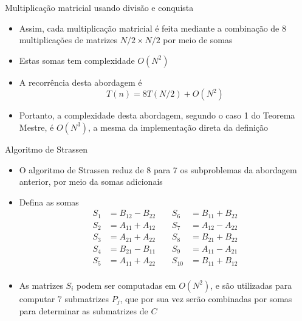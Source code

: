 \begin{frame}[fragile]{Multiplicação matricial usando divisão e conquista}

    \begin{itemize}
        \item Assim, cada multiplicação matricial é feita mediante a combinação de 8 multiplicações
            de matrizes $N/2 \times N/2$ por meio de somas

        \item Estas somas tem complexidade $O(N^2)$

        \item A recorrência desta abordagem é
        \[
            T(n) = 8T(N/2) + O(N^2)
        \]

        \item Portanto, a complexidade desta abordagem, segundo o caso 1 do Teorema Mestre, é
            $O(N^3)$, a mesma da implementação direta da definição

    \end{itemize}

\end{frame}

\begin{frame}[fragile]{Algoritmo de Strassen}

    \begin{itemize}
        \item O algoritmo de Strassen reduz de 8 para 7 os subproblemas da abordagem anterior,
            por meio da somas adicionais

        \item Defina as somas 
        \begin{align*}
            S_1 &= B_{12} - B_{22} & \ \ \ \ \ S_6 &=  B_{11} + B_{22} \\
            S_2 &= A_{11} + A_{12} & \ \ \ \ \ S_7 &=  A_{12} - A_{22} \\
            S_3 &= A_{21} + A_{22} & \ \ \ \ \ S_8 &=  B_{21} + B_{22} \\
            S_4 &= B_{21} - B_{11} & \ \ \ \ \ S_9 &=  A_{11} - A_{21} \\
            S_5 &= A_{11} + A_{22} & \ \ \ \ \ S_{10} &=  B_{11} + B_{12} \\
        \end{align*}

        \item As matrizes $S_i$ podem ser computadas em $O(N^2)$, e são utilizadas para 
            computar 7 submatrizes $P_j$, que por sua vez serão combinadas por somas para 
            determinar as submatrizes de $C$
    \end{itemize}

\end{frame}

